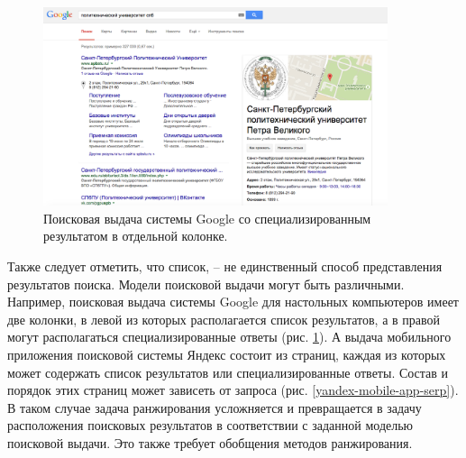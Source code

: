 \documentclass[12pt,a4paper]{report}
\newcommand\figref[1]{(рис. \ref{#1})}
\begin{document}

\begin{figure}[b!]
  \centering
  \includegraphics[width=0.9\textwidth]{pics/EntitySearch-Google.png}
  \caption{Поисковая выдача системы Google со специализированным результатом в отдельной колонке.}
  \label{two-coloumn-serp}
\end{figure}

Также следует отметить, что список, -- не единственный способ представления результатов поиска. Модели поисковой выдачи могут быть различными. Например, поисковая выдача системы Google для настольных компьютеров имеет две колонки, в левой из которых располагается список результатов, а в правой могут располагаться специализированные ответы \figref{two-coloumn-serp}. А выдача мобильного приложения поисковой системы Яндекс состоит из страниц, каждая из которых может содержать список результатов или специализированные ответы. Состав и порядок этих страниц может зависеть от запроса \figref{yandex-mobile-app-serp}. В таком случае задача ранжирования усложняется и превращается в задачу расположения поисковых результатов в соответствии с заданной моделью поисковой выдачи. Это также требует обобщения методов ранжирования.
\end{document}

